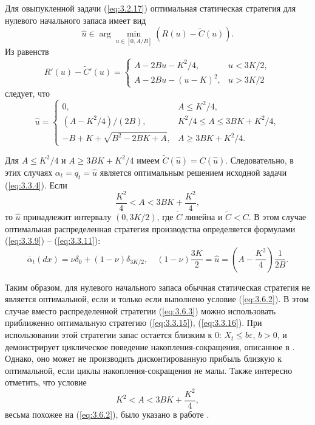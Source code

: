 Для овыпукленной задачи (\ref{eq:3.2.17}) оптимальная статическая стратегия для нулевого начального запаса имеет вид
$$ \widehat u\in\arg\min_{u\in [0,A/B]}(R(u)-\widetilde C(u)).$$
Из равенств
$$ R'(u)-\widetilde C'(u)=\begin{cases}
A-2Bu-K^2/4,& u<3K/2,\\
A-2Bu-(u-K)^2,& u>3K/2
\end{cases}$$
следует, что
\begin{equation} \label{eq:3.6.1}
\widehat u=\begin{cases}
0,& A\le K^2/4,\\
(A-K^2/4)/(2B),& K^2/4\le A\le 3BK+K^2/4,\\
-B+K+\sqrt{B^2-2BK+A},& A\ge 3BK+K^2/4.
\end{cases}
\end{equation}

Для $A\le K^2/4$ и $A\ge 3BK+K^2/4$ имеем $\widetilde C(\widehat u)=C(\widehat u)$. Следовательно, в этих случаях $\alpha_t=q_t=\widehat u$ является оптимальным решением исходной задачи (\ref{eq:3.3.4}). Если
\begin{equation} \label{eq:3.6.2}
\frac{K^2}{4}< A< 3BK+\frac{K^2}{4},
\end{equation}
то $\widehat u$ принадлежит интервалу $(0,3K/2)$, где $\widetilde C$ линейна и $\widetilde C<C$. В этом случае оптимальная распределенная стратегия производства определяется формулами (\ref{eq:3.3.9}) -- (\ref{eq:3.3.11}):
\begin{equation} \label{eq:3.6.3}
\overline\alpha_t(dx)=\nu\delta_0+(1-\nu)\delta_{3K/2},\quad (1-\nu)\frac{3K}{2}=\widehat u=\left(A-\frac{K^2}{4}\right)\frac{1}{2B}.
\end{equation}

Таким образом, для нулевого начального запаса обычная статическая стратегия не является оптимальной, если и только если выполнено условие (\ref{eq:3.6.2}). В этом случае вместо распределенной стратегии (\ref{eq:3.6.3}) можно использовать приближенно оптимальную стратегию (\ref{eq:3.3.15}), (\ref{eq:3.3.16}). При использовании этой стратегии запас остается близким к $0$: $X_t\le b\varepsilon$, $b>0$, и демонстрирует циклическое поведение накопления-сокращения, описанное в \cite{ArvMos81}. Однако, оно может не производить дисконтированную прибыль близкую к оптимальной, если циклы накопления-сокращения не малы. Также интересно отметить, что условие
$$ K^2< A< 3BK+\frac{K^2}{4},$$
весьма похожее на (\ref{eq:3.6.2}), было указано в работе \cite{ArvMos81}.

